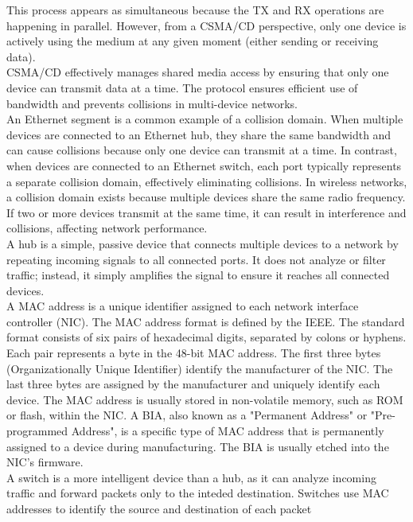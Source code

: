 \documentclass[parindent=0pt]{article}
\begin{document}
This process appears as simultaneous because the TX and RX operations are happening in parallel. However, from a CSMA/CD perspective, only one device is actively using the medium at any given moment (either sending or receiving data).\\

CSMA/CD effectively manages shared media access by ensuring that only one device can transmit data at a time. The protocol ensures efficient use of bandwidth and prevents collisions in multi-device networks.\\

An Ethernet segment is a common example of a collision domain. When multiple devices are connected to an Ethernet hub, they share the same bandwidth and can cause collisions because only one device can transmit at a time. In contrast, when devices are connected to an Ethernet switch, each port typically represents a separate collision domain, effectively eliminating collisions. In wireless networks, a collision domain exists because multiple devices share the same radio frequency. If two or more devices transmit at the same time, it can result in interference and collisions, affecting network performance.\\

A hub is a simple, passive device that connects multiple devices to a network by repeating incoming signals to all connected ports. It does not analyze or filter traffic; instead, it simply amplifies the signal to ensure it reaches all connected devices.\\

A MAC address is a unique identifier assigned to each network interface controller (NIC). The MAC address format is defined by the IEEE. The standard format consists of six pairs of hexadecimal digits, separated by colons or hyphens. Each pair represents a byte in the 48-bit MAC address. The first three bytes (Organizationally Unique Identifier) identify the manufacturer of the NIC. The last three bytes are assigned by the manufacturer and uniquely identify each device. The MAC address is usually stored in non-volatile memory, such as ROM or flash, within the NIC. A BIA, also known as a "Permanent Address" or "Pre-programmed Address", is a specific type of MAC address that is permanently assigned to a device during manufacturing. The BIA is usually etched into the NIC's firmware.\\

A switch is a more intelligent device than a hub, as it can analyze incoming traffic and forward packets only to the inteded destination. Switches use MAC addresses to identify the source and destination of each packet\\
\end{document}
